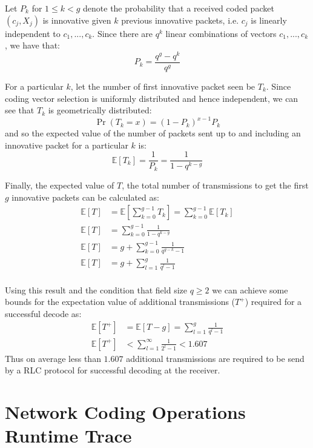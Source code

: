 \documentclass[12pt,a4paper,twoside,openright]{report}
\begin{document}
Let $P_k$ for $1 \leq k < g$ denote the probability that a received coded packet $(c_j, X_j)$ is innovative given $k$ previous innovative packets, i.e. $c_j$ is linearly independent to $c_1, ..., c_{k}$. Since there are $q^{k}$ linear combinations of vectors $c_1, ..., c_{k}$, we have that:
\begin{equation}
	P_k = \frac{q^g - q^{k}}{q^g}
\end{equation}

For a particular $k$, let the number of first innovative packet seen be $T_k$. Since coding vector selection is uniformly distributed and hence independent, we can see that $T_k$ is geometrically distributed:
\[
\Pr(T_k = x) = (1 - P_k)^{x - 1} P_k
\]
and so the expected value of the number of packets sent up to and including an innovative packet for a particular $k$ is:
\begin{equation}
\mathbb{E}\left[ T_k \right] = \frac{1}{P_k} = \frac{1}{1 - q^{k - g}}
\end{equation}

Finally, the expected value of $T$, the total number of transmissions to get the first $g$ innovative packets can be calculated as:
\begin{align}
	\mathbb{E}\left[ T \right] &= \mathbb{E}\left[ \sum_{k = 0}^{g - 1} T_k \right] = \sum_{k = 0}^{g - 1} \mathbb{E} \left[ T_k \right] \\
	\mathbb{E}\left[ T \right] &= \sum_{k = 0}^{g - 1} \frac{1}{1 - q^{k - g}} \\
	\mathbb{E}\left[ T \right] &= g + \sum_{k = 0}^{g - 1} \frac{1}{q^{g - k} - 1} \\
	\mathbb{E}\left[ T \right] &= g + \sum_{l = 1}^{g} \frac{1}{q^{l} - 1} \\
\end{align}

Using this result and the condition that field size $q \geq 2$ we can achieve some bounds for the expectation value of additional transmissions ($T^+$) required for a successful decode as:
\begin{align}
	\mathbb{E}\left[T^+\right] &= \mathbb{E}\left[T - g \right] = \sum_{l = 1}^{g} \frac{1}{q^{l} - 1} \\
	\mathbb{E}\left[ T^+ \right] &< \sum_{l = 1}^{\infty} \frac{1}{2^{l} - 1} < 1.607
\end{align}
Thus on average less than $1.607$ additional transmissions are required to be send by a RLC protocol for successful decoding at the receiver.

\chapter{Network Coding Operations Runtime Trace}
\end{document}
